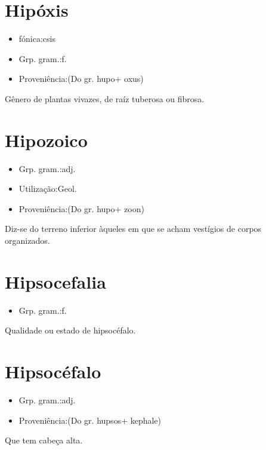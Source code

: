 \documentclass{article}
\begin{document}
\section{Hipóxis}
\begin{itemize}
\item {fónica:csis}
\end{itemize}
\begin{itemize}
\item {Grp. gram.:f.}
\end{itemize}
\begin{itemize}
\item {Proveniência:(Do gr. \textunderscore hupo\textunderscore  + \textunderscore oxus\textunderscore )}
\end{itemize}
Gênero de plantas vivazes, de raíz tuberosa ou fibrosa.
\section{Hipozoico}
\begin{itemize}
\item {Grp. gram.:adj.}
\end{itemize}
\begin{itemize}
\item {Utilização:Geol.}
\end{itemize}
\begin{itemize}
\item {Proveniência:(Do gr. \textunderscore hupo\textunderscore  + \textunderscore zoon\textunderscore )}
\end{itemize}
Diz-se do terreno inferior àqueles em que se acham vestígios de corpos organizados.
\section{Hipsocefalia}
\begin{itemize}
\item {Grp. gram.:f.}
\end{itemize}
Qualidade ou estado de hipsocéfalo.
\section{Hipsocéfalo}
\begin{itemize}
\item {Grp. gram.:adj.}
\end{itemize}
\begin{itemize}
\item {Proveniência:(Do gr. \textunderscore hupsos\textunderscore  + \textunderscore kephale\textunderscore )}
\end{itemize}
Que tem cabeça alta.
\end{document}
